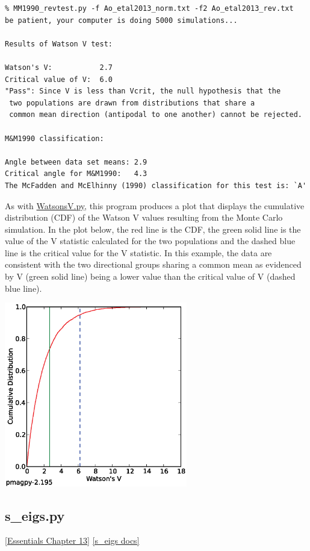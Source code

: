 \documentclass[11pt]{book}
\begin{document}
{{\begin{verbatim}
% MM1990_revtest.py -f Ao_etal2013_norm.txt -f2 Ao_etal2013_rev.txt
be patient, your computer is doing 5000 simulations...

Results of Watson V test: 

Watson's V:           2.7
Critical value of V:  6.0
"Pass": Since V is less than Vcrit, the null hypothesis that the
 two populations are drawn from distributions that share a 
 common mean direction (antipodal to one another) cannot be rejected.

M&M1990 classification:

Angle between data set means: 2.9
Critical angle for M&M1990:   4.3
The McFadden and McElhinny (1990) classification for this test is: `A'
\end{verbatim}

As with \href{#WatsonsV.py}{WatsonsV.py}, this program produces a plot that displays the cumulative distribution (CDF) of the Watson V values resulting from the Monte Carlo simulation. In the plot below, the red line is the CDF, the green solid line is the value of the V statistic calculated for the two populations and the dashed blue line is the critical value for the V statistic. In this example, the data are consistent with the two directional groups sharing a common mean as evidenced by V (green solid line) being a lower value than the critical value of V (dashed blue line).

\includegraphics[width=8cm]{EPSfiles/WatsonsV_Ao_etal2013.eps}

\subsection{s\_eigs.py} 
\href{http://magician.ucsd.edu/Essentials_2/WebBook2ch13.html#ch13}{[Essentials Chapter 13]}
\href{http://earthref.org/PmagPy/pmagpydocs/s_eigs-module.html}{[s\_eigs docs]}

}}
\end{document}
